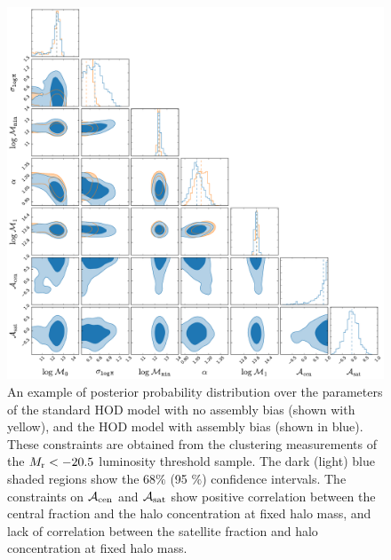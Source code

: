 \begin{figure}[p]~\\
\begin{center}
\includegraphics[width=\textwidth]{post20_5combined.pdf}
\caption{An example of posterior probability distribution over the parameters of the standard HOD model with no assembly bias (shown with yellow), and the HOD model with assembly bias (shown in blue). These constraints are obtained from the clustering measurements of the $M_{\rm r} < -20.5$ luminosity threshold sample. The dark (light) blue shaded regions show the 68$\%$ (95 $\%$) confidence intervals. The constraints on $\mathcal{A}_{\rm cen}$ and $\mathcal{A}_{\rm sat}$ show positive correlation between the central fraction and the halo concentration at fixed halo mass, and lack of correlation between the satellite fraction and halo concentration at fixed halo mass.}
\label{fig:posterior}
\end{center}
\end{figure}






